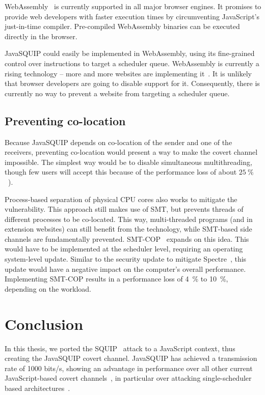 \documentclass[11pt,
  titlepage=false,
  parskip=half,      %
]{scrreprt}
\begin{document}
WebAssembly~\cite{webassembly} is currently supported in all major browser engines.
It promises to provide web developers with faster execution times by circumventing JavaScript's just-in-time compiler.
Pre-compiled WebAssembly binaries can be executed directly in the browser.

JavaSQUIP could easily be implemented in WebAssembly, using its fine-grained control over instructions to
target a scheduler queue.
WebAssembly is currently a rising technology -- more and more websites are implementing it~\cite{musch2019new}.
It is unlikely that browser developers are going to disable support for it.
Consequently, there is currently no way to prevent a website from targeting a scheduler queue.

\section{Preventing co-location}
Because JavaSQUIP depends on co-location of the sender and one of the receivers,
preventing co-location would present a way to make the covert channel impossible.
The simplest way would be to disable simultaneous multithreading,
though few users will accept this because of the performance loss of about $25~\%$~\cite{Phoronix2018HT, Cutress2020SMT}).

Process-based separation of physical CPU cores also works to mitigate the vulnerability.
This approach still makes use of SMT, but prevents threads of different processes to be co-located.
This way, multi-threaded programs (and in extension websites) can still benefit from the technology,
while SMT-based side channels are fundamentally prevented.
SMT-COP~\cite{townley2019smt} expands on this idea.
This would have to be implemented at the scheduler level, requiring an operating system-level update.
Similar to the security update to mitigate Spectre~\cite{spKocherHFGGHHLM019},
this update would have a negative impact on the computer's overall performance.
Implementing SMT-COP results in a performance loss of 4~\% to 10~\%, depending on the workload.

\chapter{Conclusion}
\label{ch:conclusion}
In this thesis, we ported the SQUIP~\cite{squip} attack to a JavaScript context, thus creating the JavaSQUIP covert channel.
JavaSQUIP has achieved a transmission rate of 1000 bits/s, showing an advantage in performance over
all other current JavaScript-based covert channels~\cite{vila2017loophole, lipp2017practical},
in particular over attacking single-scheduler based architectures~\cite{Rokicki2022webport}.
\end{document}
